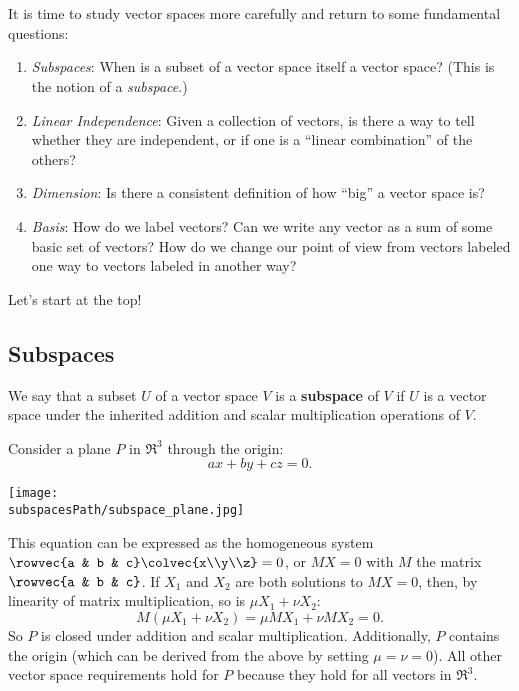 \chapter{\subspacesTitle}\label{subspacesspanning}

It is time to study vector spaces more carefully and return to  some fundamental questions:

\begin{enumerate}
\item \emph{Subspaces}: When is a subset of a vector space itself a vector space?  (This is the notion of a \emph{subspace}.)

\item \emph{Linear Independence}: Given a collection of vectors, is there a way to tell whether they are independent, or if one is a ``linear combination'' of the others? 

\item \emph{Dimension}: Is there a consistent definition of how ``big'' a vector space is?

\item \emph{Basis}:  How do we label vectors?  Can we write any vector as a sum of some basic set of vectors?  How do we change our point of view from vectors labeled one way to vectors labeled in another way?
\end{enumerate}
Let's start at the top!

\section{Subspaces}

\begin{definition}
We say that a subset $U$ of a vector space $V$ is a {\bf subspace} of $V$ if $U$ is a vector space under the inherited addition and scalar multiplication operations of $V$. 
\end{definition}

\begin{example}
Consider a plane $P$ in $\Re^3$ through the origin:
\[
ax+by+cz=0.
\]

\begin{center}
\texttt{[image: \\subspacesPath/subspace\_plane.jpg]}
\end{center}
This equation can be expressed as the homogeneous system $\rowvec{a & b & c}\colvec{x\\y\\z}=0$, or $MX=0$ with $M$ the matrix $\rowvec{a & b & c}$.  If $X_1$ and $X_2$ are both solutions to $MX=0$, then, by linearity of matrix multiplication, so is $\mu X_1 + \nu X_2$:
\[
M(\mu X_1 + \nu X_2) = \mu MX_1 + \nu MX_2 = 0.
\]
So $P$ is closed under addition and scalar multiplication.  Additionally, $P$ contains the origin (which can be derived from the above by setting $\mu=\nu=0$).  All other vector space requirements hold for $P$ because they hold for all vectors in $\Re^3$.
\end{example}


